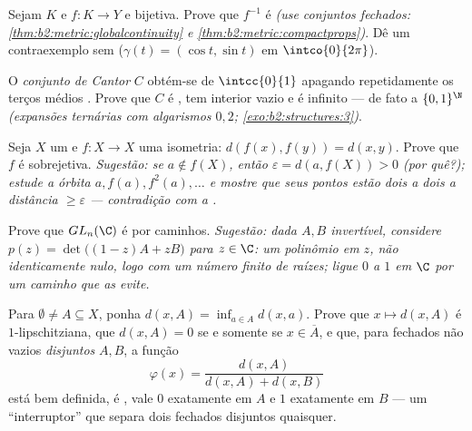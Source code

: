 \begin{exercise}[$\star\star$]\label{exo:b2:metric:7}
Sejam $K$  e $f \colon K \to Y$  e bijetiva.
Prove que $f^{-1}$ é  \emph{(use conjuntos fechados:
\cref{thm:b2:metric:globalcontinuity} e
\cref{thm:b2:metric:compactprops})}. Dê um contraexemplo sem
 ($\gamma(t) = (\cos t, \sin t)$ em
$\intco{0}{2\pi}$).
\end{exercise}

\begin{exercise}[$\star\star$]\label{exo:b2:metric:8}
O \emph{conjunto de Cantor} $C$ obtém-se de $\intcc{0}{1}$
apagando repetidamente os terços médios . Prove que $C$ é ,
tem interior vazio e é infinito --- de fato  a
$\{0,1\}^{\N}$ \emph{(expansões ternárias com algarismos $0,2$;
\cref{exo:b2:structures:3})}.
\end{exercise}

\begin{exercise}[$\star\star\star$]\label{exo:b2:metric:9}
Seja $X$ um \emph{} e $f \colon X \to X$ uma
isometria: $d(f(x), f(y)) = d(x, y)$. Prove que $f$ é sobrejetiva.
\emph{Sugestão: se $a \notin f(X)$, então $\varepsilon = d(a, f(X)) > 0$
(por quê?); estude a órbita $a, f(a), f^2(a), \dots$ e mostre que seus
pontos estão dois a dois a distância $\geq \varepsilon$ --- contradição com a
.}
\end{exercise}

\begin{exercise}[$\star\star\star$]\label{exo:b2:metric:10}
Prove que $GL_n(\C)$ é  por caminhos. \emph{Sugestão: dada $A, B$
invertível, considere $p(z) = \det\bigl((1 - z)A + zB\bigr)$ para $z
\in \C$: um polinômio em $z$, não identicamente nulo, logo com
um número finito de raízes; ligue $0$ a $1$ em $\C$ por um caminho que as evite.}
\end{exercise}

\begin{exercise}[$\star\star$]\label{exo:b2:metric:11}
Para $\emptyset \neq A \subseteq X$, ponha $d(x, A) = \inf_{a \in A}
d(x, a)$. Prove que $x \mapsto d(x, A)$ é $1$-lipschitziana, que
$d(x, A) = 0$ se e somente se $x \in \overline A$, e que, para fechados não vazios
\emph{disjuntos} $A, B$, a função
\[
\varphi(x) = \frac{d(x, A)}{d(x, A) + d(x, B)}
\]
está bem definida, é , vale $0$ exatamente em $A$ e
$1$ exatamente em $B$ --- um ``interruptor''  que separa dois
fechados disjuntos quaisquer.
\end{exercise}

